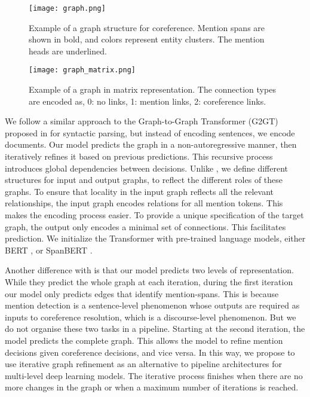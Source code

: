 \documentclass[11pt]{article}
\begin{document}
\begin{figure}
	\center
	\texttt{[image: graph.png]}
	\caption{Example of a graph structure for coreference. Mention spans are shown in bold, and colors represent entity clusters. The mention heads are underlined.}
	\label{fig:coreference:exa}
\end{figure}

\begin{figure}
	\center
	\texttt{[image: graph\_matrix.png]}
	\caption{Example of a graph in matrix representation. The connection types are encoded as, 0: no links, 1: mention links, 2: coreference links. }
	\label{fig:coreference:exa-mat}
\end{figure}


We follow a similar approach to the Graph-to-Graph Transformer (G2GT) proposed in \cite{mohammadshahi2020recursive, mohammadshahi-henderson-2020-graph} for syntactic parsing, but instead of encoding sentences, we encode documents. Our model predicts the graph in a non-autoregressive manner, then iteratively refines it based on previous predictions.  This recursive process introduces global dependencies between decisions.
Unlike \cite{mohammadshahi2020recursive}, we define different structures for input and output graphs, to reflect the different roles of these graphs. To ensure that locality in the input graph reflects all the relevant relationships, the input graph encodes relations for all mention 
tokens.  This makes the encoding process easier.  To provide a unique specification of the target graph, the output only encodes a minimal set of connections.  This facilitates prediction.
We initialize the Transformer with pre-trained language models, either BERT \cite{devlin-etal-2019-bert}, or SpanBERT \cite{joshi-etal-2020-spanbert}.

Another difference with \cite{mohammadshahi2020recursive} is that our model predicts two levels of representation.  While they predict the whole graph at each iteration, 
during the first iteration our model only predicts edges that identify mention-spans.  This is because mention detection is a sentence-level phenomenon whose outputs are required as inputs to coreference resolution, which is a discourse-level phenomenon.  But we do not organise these two tasks in a pipeline.  Starting at the second iteration, the model predicts the complete graph.  This allows the model to refine mention decisions given coreference decisions, and vice versa.  In this way, we propose to use iterative graph refinement as an alternative to pipeline architectures for multi-level deep learning models. The iterative process finishes when there are no more changes in the graph or when a maximum number of iterations is reached.
\end{document}
